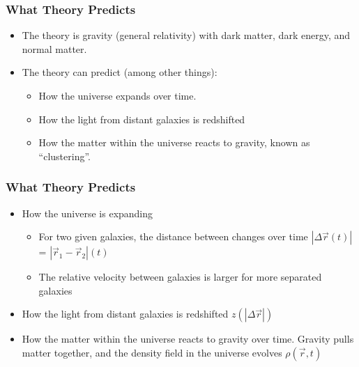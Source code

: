 \documentclass{beamer}
\begin{document}
\frame
{

    \frametitle{What Theory Predicts}


    \begin{itemize}

        \item The theory is gravity (general relativity) with dark matter, dark
            energy, and normal matter.

        \item The theory can predict (among other things):
            
            \begin{itemize}

                \item How the universe expands over time.

                \item How the light from distant galaxies is redshifted

                \item How the matter within the universe reacts to gravity, known
                    as ``clustering''.

            \end{itemize}

    \end{itemize}

}


\frame
{

    \frametitle{What Theory Predicts}



    \begin{itemize}

        \item How the universe is expanding

            \begin{itemize}
                    
                \item For two given galaxies, the distance between changes over
                    time {\color{gold} $|\Delta \vec{r} (t)|$ =
                     $| \vec{r}_1 - \vec{r}_2 |(t) $ }

                \item The relative velocity between galaxies is larger
                    for more separated galaxies

            \end{itemize}

        \item How the light from distant galaxies is redshifted {\color{gold}
            $z(|\Delta \vec{r}|)$}

        \item How the matter within the universe reacts to gravity over time.
            Gravity pulls matter together, and the density field
            in the universe evolves {\color{gold} $\rho(\vec{r},t)$}



    \end{itemize}

}
\end{document}

